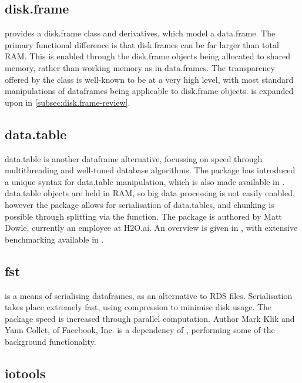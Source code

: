\subsection{disk.frame}\label{subsec:disk.frame}

 provides a disk.frame class and derivatives, which model a
data.frame. The primary functional difference is that disk.frames can be
far larger than total RAM. This is enabled through the disk.frame
objects being allocated to shared memory, rather than working memory as
in data.frames. The transparency offered by the class is well-known to
be at a very high level, with most standard manipulations of dataframes
being applicable to disk.frame objects.  is expanded upon in \cref{subsec:disk.frame-review}.

\subsection{data.table}\label{subsec:data.table}

data.table is another dataframe alternative, focussing on speed through
multithreading and well-tuned database algorithms\cite{dowle19}. The
package has introduced a unique syntax for data.table manipulation,
which is also made available in . data.table objects are held
in RAM, so big data processing is not easily enabled, however the
package allows for serialisation of data.tables, and chunking is
possible through splitting via the  function. The package
is authored by Matt Dowle, currently an employee at H2O.ai. An overview
is given in \cite{dowle19:_introd}, with extensive benchmarking
available in \cite{dowle19:_bench}.

\subsection{fst}\label{subsec:fst}

 is a means of serialising dataframes, as an alternative to RDS
files\cite{klik19}. Serialisation takes place extremely fast, using
compression to minimise disk usage. The package speed is increased
through parallel computation. Author Mark Klik and Yann Collet, of
Facebook, Inc.  is a dependency of , performing some of the
background functionality.

\subsection{iotools}\label{subsec:iotools}

